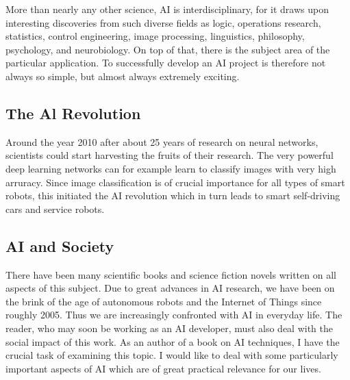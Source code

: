 \documentclass[10pt]{book}
\begin{document}
More than nearly any other science, AI is interdisciplinary, for it draws upon interesting discoveries from such diverse fields as logic, operations research, statistics, control engineering, image processing, linguistics, philosophy, psychology, and neurobiology. On top of that, there is the subject area of the particular application. To successfully develop an AI project is therefore not always so simple, but almost always extremely exciting.

\subsection{The Al Revolution}
Around the year 2010 after about 25 years of research on neural networks, scientists could start harvesting the fruits of their research. The very powerful deep learning networks can for example learn to classify images with very high arruracy. Since image classification is of crucial importance for all types of smart robots, this initiated the AI revolution which in turn leads to smart self-driving cars and service robots.

\subsection{AI and Society}
There have been many scientific books and science fiction novels written on all aspects of this subject. Due to great advances in AI research, we have been on the brink of the age of autonomous robots and the Internet of Things since roughly 2005. Thus we are increasingly confronted with AI in everyday life. The reader, who may soon be working as an AI developer, must also deal with the social impact of this work. As an author of a book on AI techniques, I have the crucial task of examining this topic. I would like to deal with some particularly important aspects of AI which are of great practical relevance for our lives.
\end{document}
